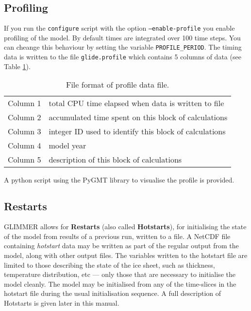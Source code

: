 \subsection{Profiling}\label{ug.sec.profile}
If you run the \texttt{configure} script with the option \texttt{--enable-profile} you enable profiling of the model. By default times are integrated over 100 time steps. You can cheange this behaviour by setting the variable \texttt{PROFILE\_PERIOD}. The timing data is written to the file \texttt{glide.profile} which contains 5 columns of data (see Table \ref{ug.tab.profile_format}).
\begin{table}[htbp]
  \centering
  \begin{tabular}{|l|l|}
    \hline
    Column 1 &total CPU time elapsed when data is written to file\\
    Column 2 &accumulated time spent on this block of calculations\\
    Column 3 &integer ID used to identify this block of calculations\\
    Column 4 &model year\\
    Column 5 &description of this block of calculations\\
    \hline
  \end{tabular}
  \caption{File format of profile data file.}
  \label{ug.tab.profile_format}
\end{table}
A python script using the PyGMT library to visualise the profile is provided.
%
\subsection{Restarts}\label{ug.sec.restarts}
%
GLIMMER allows for {\bf Restarts} (also called {\bf Hotstarts}), for initialising the state of the model from results of a previous run, written to a file. A NetCDF file containing \emph{hotstart} data may be written as part of the regular output from the model, along with other output files. The variables written to the hotstart file are limited to those describing the state of the ice sheet, such as thickness, temperature distribution, etc --- only those that are necessary to initialise the model cleanly. The model may be initialised from any of the time-slices in the hotstart file during the usual initialisation sequence.
%
A full description of Hotstarts is given later in this manual.